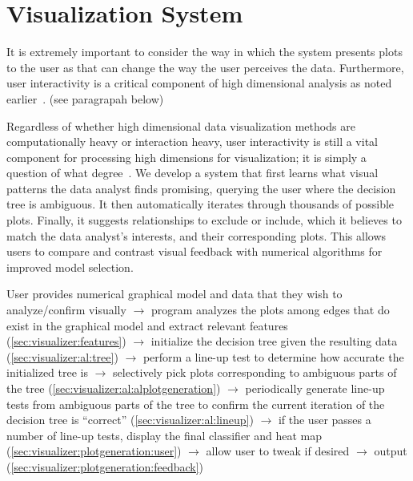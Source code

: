 \chapter{Visualization System \label{ch:visualizer}}

It is extremely important to consider the way in which the system presents plots
to the user as that can change the way the user perceives the data. Furthermore,
user interactivity is a critical component of high dimensional analysis as noted
earlier~\cite{lius2016}. (see paragrapah below)

Regardless of whether high dimensional data visualization methods are
computationally heavy or interaction heavy, user interactivity is still a vital
component for processing high dimensions for visualization; it is simply a
question of what degree~\cite{lius2016}. We develop a system that first learns
what visual patterns the data analyst finds promising, querying the user where
the decision tree is ambiguous. It then automatically iterates through thousands
of possible plots. Finally, it suggests relationships to exclude or include,
which it believes to match the data analyst's interests, and their corresponding
plots. This allows users to compare and contrast visual feedback with numerical
algorithms for improved model selection.

User provides numerical graphical model and data that they wish to
analyze/confirm visually $\rightarrow$ program analyzes the plots among edges
that do exist in the graphical model and extract relevant features
(\ref{sec:visualizer:features}) $\rightarrow$ initialize the decision tree given
the resulting data (\ref{sec:visualizer:al:tree}) $\rightarrow$ perform a
line-up test to determine how accurate the initialized tree is $\rightarrow$ 
selectively pick plots corresponding to ambiguous parts of the tree
(\ref{sec:visualizer:al:alplotgeneration}) $\rightarrow$ periodically generate
line-up tests from ambiguous parts of the tree to confirm the current iteration
of the decision tree is ``correct'' (\ref{sec:visualizer:al:lineup})
$\rightarrow$  if the user passes a number of line-up tests, display the final
classifier and heat map (\ref{sec:visualizer:plotgeneration:user}) $\rightarrow$
allow user to tweak if desired $\rightarrow$ output
(\ref{sec:visualizer:plotgeneration:feedback})





